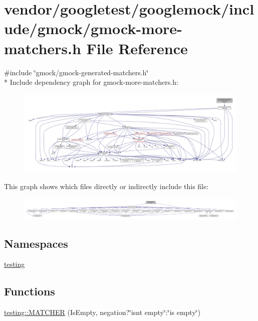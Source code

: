 \hypertarget{gmock-more-matchers_8h}{}\section{vendor/googletest/googlemock/include/gmock/gmock-\/more-\/matchers.h File Reference}
\label{gmock-more-matchers_8h}
{\ttfamily \#include \char`\"{}gmock/gmock-\/generated-\/matchers.\+h\char`\"{}}\\*
Include dependency graph for gmock-\/more-\/matchers.h\+:\nopagebreak
\begin{figure}[H]
\begin{center}
\leavevmode
\includegraphics[width=350pt]{gmock-more-matchers_8h__incl}
\end{center}
\end{figure}
This graph shows which files directly or indirectly include this file\+:\nopagebreak
\begin{figure}[H]
\begin{center}
\leavevmode
\includegraphics[width=350pt]{gmock-more-matchers_8h__dep__incl}
\end{center}
\end{figure}
\subsection*{Namespaces}
\begin{DoxyCompactItemize}
\item 
 \hyperlink{namespacetesting}{testing}
\end{DoxyCompactItemize}
\subsection*{Functions}
\begin{DoxyCompactItemize}
\item 
\hyperlink{namespacetesting_a25b4065291778029b6311f07c2fc9cc3}{testing\+::\+M\+A\+T\+C\+H\+ER} (Is\+Empty, negation?\char`\"{}isn\textquotesingle{}t empty\char`\"{}\+:\char`\"{}is empty\char`\"{})
\end{DoxyCompactItemize}
